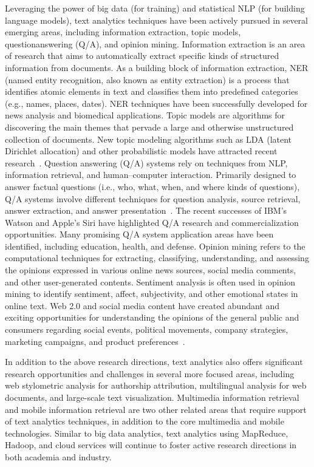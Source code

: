 Leveraging the power of big data (for training) and statistical
NLP (for building language models), text analytics techniques
have been actively pursued in several emerging areas,
including information extraction, topic models, questionanswering
(Q/A), and opinion mining. Information extraction
is an area of research that aims to automatically extract
specific kinds of structured information from documents. As
a building block of information extraction, NER (named
entity recognition, also known as entity extraction) is a
process that identifies atomic elements in text and classifies
them into predefined categories (e.g., names, places, dates).
NER techniques have been successfully developed for news
analysis and biomedical applications. Topic models are algorithms
for discovering the main themes that pervade a large
and otherwise unstructured collection of documents. New
topic modeling algorithms such as LDA (latent Dirichlet
allocation) and other probabilistic models have attracted
recent research~\cite{Blei:2012}. Question answering (Q/A) systems
rely on techniques from NLP, information retrieval, and
human–computer interaction. Primarily designed to answer
factual questions (i.e., who, what, when, and where kinds of
questions), Q/A systems involve different techniques for
question analysis, source retrieval, answer extraction, and
answer presentation~\cite{Maybury:2004}. The recent successes
of IBM’s Watson and Apple’s Siri have highlighted Q/A
research and commercialization opportunities. Many promising
Q/A system application areas have been identified,
including education, health, and defense. Opinion mining
refers to the computational techniques for extracting, classifying,
understanding, and assessing the opinions expressed in
various online news sources, social media comments, and
other user-generated contents. Sentiment analysis is often
used in opinion mining to identify sentiment, affect, subjectivity,
and other emotional states in online text. Web 2.0 and
social media content have created abundant and exciting
opportunities for understanding the opinions of the general
public and consumers regarding social events, political movements,
company strategies, marketing campaigns, and product
preferences~\cite{Pang:2008}.

In addition to the above research directions, text analytics also
offers significant research opportunities and challenges in
several more focused areas, including web stylometric
analysis for authorship attribution, multilingual analysis for
web documents, and large-scale text visualization. Multimedia
information retrieval and mobile information retrieval
are two other related areas that require support of text
analytics techniques, in addition to the core multimedia and
mobile technologies. Similar to big data analytics, text
analytics using MapReduce, Hadoop, and cloud services will
continue to foster active research directions in both academia
and industry.

